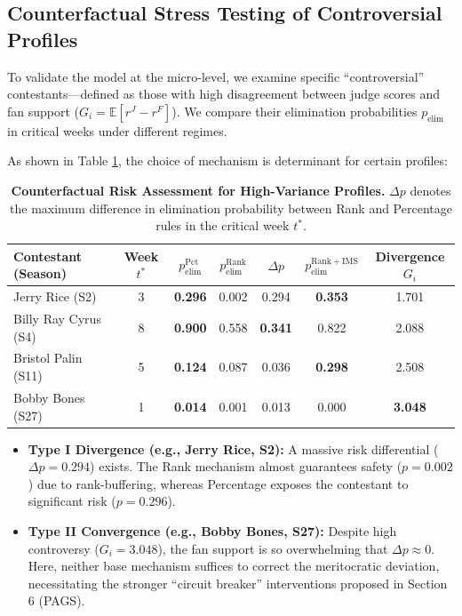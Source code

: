 \subsection{Counterfactual Stress Testing of Controversial Profiles }
\label{sec:q2_cases}

To validate the model at the micro-level, we examine specific ``controversial'' contestants—defined as those with high disagreement between judge scores and fan support ($G_i = \mathbb{E}[r^J - r^F]$). We compare their elimination probabilities $p_{\mathrm{elim}}$ in critical weeks under different regimes.

As shown in Table \ref{tab:controversy}, the choice of mechanism is determinant for certain profiles:

\begin{table}[H]
    \centering
    \caption{\textbf{Counterfactual Risk Assessment for High-Variance Profiles.} $\Delta p$ denotes the maximum difference in elimination probability between Rank and Percentage rules in the critical week $t^*$.}
    \label{tab:controversy}
    \footnotesize
    \setlength{\tabcolsep}{3.5pt}
    \renewcommand{\arraystretch}{1.02}
    \begin{tabular}{lcccccc}
        \toprule
        \textbf{Contestant (Season)} & \textbf{Week $t^*$} & \textbf{$p_{\mathrm{elim}}^{\mathrm{Pct}}$} & \textbf{$p_{\mathrm{elim}}^{\mathrm{Rank}}$} & \textbf{$\Delta p$} & \textbf{$p_{\mathrm{elim}}^{\mathrm{Rank+IMS}}$} & \textbf{Divergence $G_i$} \\
        \midrule
        Jerry Rice (S2)      & 3 & \textbf{0.296}& 0.002 & {0.294}& \textbf{0.353}& 1.701 \\
        Billy Ray Cyrus (S4) & 8 & \textbf{0.900}& 0.558 & \textbf{0.341} & 0.822 & 2.088 \\
        Bristol Palin (S11)  & 5 & \textbf{0.124}& 0.087 & 0.036          & \textbf{0.298}& 2.508 \\
        Bobby Bones (S27)    & 1 & \textbf{0.014}& 0.001 & 0.013          & 0.000 & \textbf{3.048}\\
        \bottomrule
    \end{tabular}
\end{table}

\begin{itemize}
    \item \textbf{Type I Divergence (e.g., Jerry Rice, S2):} A massive risk differential ($\Delta p = 0.294$) exists. The Rank mechanism almost guarantees safety ($p=0.002$) due to rank-buffering, whereas Percentage exposes the contestant to significant risk ($p=0.296$).
    \item \textbf{Type II Convergence (e.g., Bobby Bones, S27):} Despite high controversy ($G_i=3.048$), the fan support is so overwhelming that $\Delta p \approx 0$. Here, neither base mechanism suffices to correct the meritocratic deviation, necessitating the stronger ``circuit breaker'' interventions proposed in Section 6 (PAGS).
\end{itemize}




